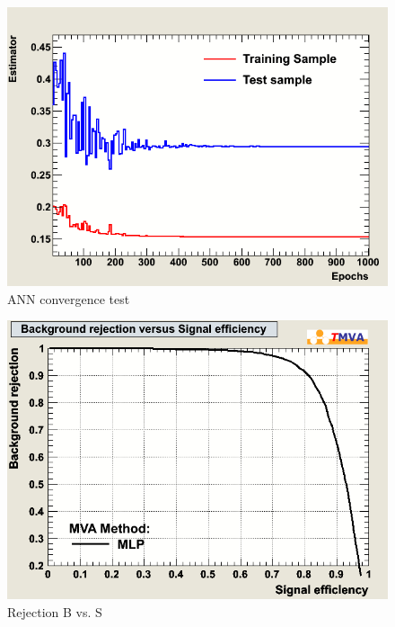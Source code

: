 \begin{figure}[h]
\begin{center}
\includegraphics[width=1.0\textwidth]{images/ahAnnconvergencetest.png}
\caption{ANN convergence test}
\label{fig:ahAnnconvergencetest}
\end{center}
\end{figure}




\begin{figure}[h]
\begin{center}
\includegraphics[width=1.0\textwidth]{images/ahRejBvsS.png}
\caption{Rejection B vs. S}
\label{fig:ahRejBvsS}
\end{center}
\end{figure}



